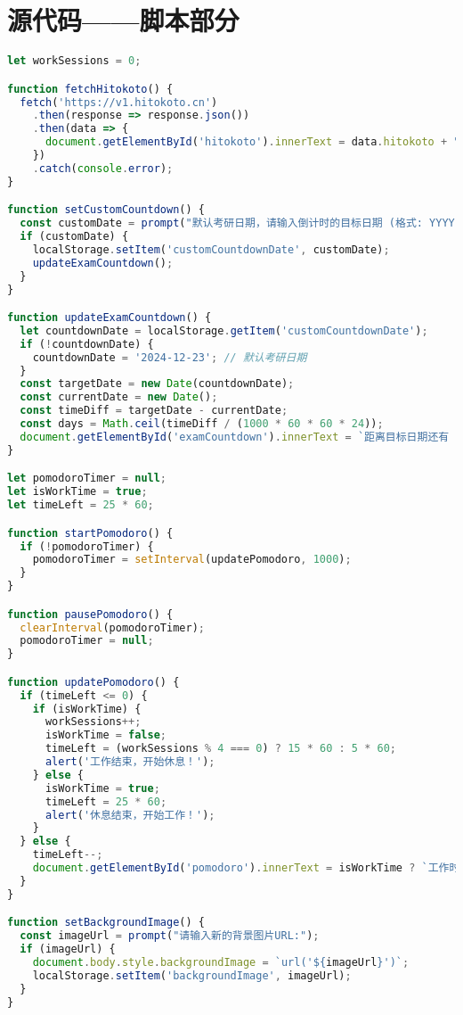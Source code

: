 \documentclass{hfutreport}
\begin{document}
\begin{appendices}
\begin{lstlisting}[language=html5]
\end{lstlisting}

\section{源代码——脚本部分}

\begin{lstlisting}[language=javascript]
let workSessions = 0;

function fetchHitokoto() {
  fetch('https://v1.hitokoto.cn')
    .then(response => response.json())
    .then(data => {
      document.getElementById('hitokoto').innerText = data.hitokoto + " —— " + data.from;
    })
    .catch(console.error);
}

function setCustomCountdown() {
  const customDate = prompt("默认考研日期，请输入倒计时的目标日期 (格式: YYYY-MM-DD):");
  if (customDate) {
    localStorage.setItem('customCountdownDate', customDate);
    updateExamCountdown();
  }
}

function updateExamCountdown() {
  let countdownDate = localStorage.getItem('customCountdownDate');
  if (!countdownDate) {
    countdownDate = '2024-12-23'; // 默认考研日期
  }
  const targetDate = new Date(countdownDate);
  const currentDate = new Date();
  const timeDiff = targetDate - currentDate;
  const days = Math.ceil(timeDiff / (1000 * 60 * 60 * 24));
  document.getElementById('examCountdown').innerText = `距离目标日期还有 ${days} 天`;
}

let pomodoroTimer = null;
let isWorkTime = true;
let timeLeft = 25 * 60;

function startPomodoro() {
  if (!pomodoroTimer) {
    pomodoroTimer = setInterval(updatePomodoro, 1000);
  }
}

function pausePomodoro() {
  clearInterval(pomodoroTimer);
  pomodoroTimer = null;
}

function updatePomodoro() {
  if (timeLeft <= 0) {
    if (isWorkTime) {
      workSessions++;
      isWorkTime = false;
      timeLeft = (workSessions % 4 === 0) ? 15 * 60 : 5 * 60;
      alert('工作结束，开始休息！');
    } else {
      isWorkTime = true;
      timeLeft = 25 * 60;
      alert('休息结束，开始工作！');
    }
  } else {
    timeLeft--;
    document.getElementById('pomodoro').innerText = isWorkTime ? `工作时间: ${Math.floor(timeLeft / 60)}:${(timeLeft % 60).toString().padStart(2, '0')}` : `休息时间: ${Math.floor(timeLeft / 60)}:${(timeLeft % 60).toString().padStart(2, '0')}`;
  }
}

function setBackgroundImage() {
  const imageUrl = prompt("请输入新的背景图片URL:");
  if (imageUrl) {
    document.body.style.backgroundImage = `url('${imageUrl}')`;
    localStorage.setItem('backgroundImage', imageUrl);
  }
}


\end{lstlisting}
\end{appendices}
\end{document}
